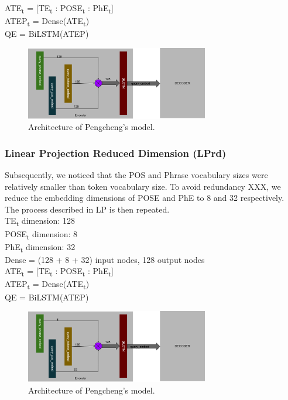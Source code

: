 \documentclass{IEEEtran}
\begin{document}
        \hspace*{-3.5mm}ATE\textsubscript{t} = [TE\textsubscript{t} : 
        POSE\textsubscript{t} : PhE\textsubscript{t}] \\
        ATEP\textsubscript{t} = Dense(ATE\textsubscript{t}) \\
        QE = BiLSTM(ATEP) \\

        \begin{figure}[h]
          \centering
          \includegraphics[width=8cm]{lp.png}
          \caption{Architecture of Pengcheng's model.}
          \label{fig:lp}
        \end{figure}

        \subsubsection{Linear Projection Reduced Dimension (LPrd)} 
        Subsequently, we noticed that the POS and Phrase vocabulary sizes were relatively smaller
        than token vocabulary size. To avoid redundancy XXX, we reduce the embedding dimensions
        of POSE and PhE to 8 and 32 respectively. The process described in LP is then repeated. \\

        \hspace*{-3.5mm}TE\textsubscript{t} dimension: 128 \\
        POSE\textsubscript{t} dimension: 8 \\
        PhE\textsubscript{t} dimension: 32 \\
        Dense = (128 + 8 + 32) input nodes, 128 output nodes \\ 

        \hspace*{-3.5mm}ATE\textsubscript{t} = [TE\textsubscript{t} : 
        POSE\textsubscript{t} : PhE\textsubscript{t}] \\
        ATEP\textsubscript{t} = Dense(ATE\textsubscript{t}) \\
        QE = BiLSTM(ATEP) \\

        \begin{figure}[h]
          \centering
          \includegraphics[width=8cm]{lprd.png}
          \caption{Architecture of Pengcheng's model.}
          \label{fig:lprd}
        \end{figure}
\end{document}
